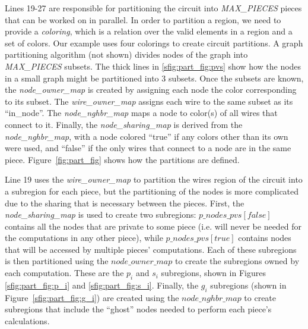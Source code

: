 Lines 19-27 are responsible for partitioning the circuit into \emph{MAX\_PIECES}
pieces that can be worked on in parallel.  In order to partition a region, we
need to provide a \emph{coloring}, which is a relation over the valid elements
in a region and a set of colors.  
Our example uses four colorings to  create circuit partitions.
A graph partitioning algorithm
(not shown) divides nodes of the graph into \emph{MAX\_PIECES}
subsets.  
The thick lines in \ref{sfig:part_fig:pvs}
show how the nodes in a small graph might be partitioned into 3 subsets.
Once the subsets are known, the \emph{node\_owner\_map} is created by assigning
each node the color corresponding to its subset.  The 
\emph{wire\_owner\_map} assigns each wire to the same subset as its ``in\_node''.
The \emph{node\_nghbr\_map} maps a node to color(s) of all wires that 
connect to it.  Finally, the \emph{node\_sharing\_map} is derived from the
\emph{node\_nghbr\_map}, with a node colored ``true'' if any colors other than 
its own were used, and ``false'' if the only wires that connect to a node are
in the same piece.
Figure~\ref{fig:part_fig} shows how the partitions are defined.

Line 19 uses the \emph{wire\_owner\_map} to partition the wires region of the
circuit into a subregion for each piece, but the partitioning of the nodes is
more complicated due to the sharing that is necessary between the pieces.
First, the \emph{node\_sharing\_map} is used to create two subregions: $p\_nodes\_pvs[false]$ contains all the nodes that are private to some piece (i.e. will
never be needed for the computations in any other piece), while $p\_nodes\_pvs[true]$ contains nodes that will be accessed by multiple pieces' computations.
Each of these subregions is then partitioned using the $node\_owner\_map$ to
create the subregions owned by each computation.  These are the $p_i$ and $s_i$
subregions, shown in Figures \ref{sfig:part_fig:p_i} and \ref{sfig:part_fig:s_i}.  Finally, the $g_i$ subregions (shown in Figure~\ref{sfig:part_fig:g_i}) are
created using the $node\_nghbr\_map$ to 
create subregions that include the ``ghost'' nodes needed to perform each
piece's calculations.

